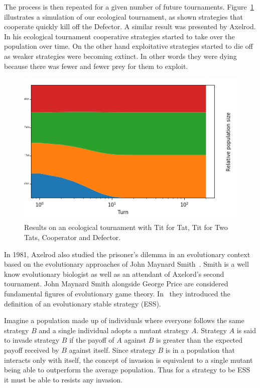 \documentclass{article}
\theoremstyle{definition}
\begin{document}
The process is then repeated for a given number of future tournaments.
Figure~\ref{fig:ecological_tournament} illustrates a simulation of our
ecological tournament, as shown strategies that cooperate quickly kill off the Defector.
A similar result was presented by Axelrod. In his ecological tournament cooperative
strategies started to take over the population over time. On the other hand exploitative
strategies started to die off as weaker strategies were becoming extinct. In other
words they were dying because there was fewer and fewer prey for them to exploit.


\begin{figure}[!hbtp]
    \centering
    \includegraphics[width=.6\textwidth]{./assets/images/ecological_tournament.png}
    \caption{Results on an ecological tournament with Tit for Tat, Tit for Two Tats,
    Cooperator and Defector.}
    \label{fig:ecological_tournament}
\end{figure}

In 1981, Axelrod also studied the prisoner's dilemma in an evolutionary context based
on the evolutionary approaches of John Maynard Smith~\cite{Smith1973,
Smith1974, Smith1979}. Smith is a well know evolutionary biologist as well
as an attendant of Axelord's second tournament. John Maynard Smith alongside George Price
are considered fundamental figures of evolutionary game theory. In~\cite{Smith1973}
they introduced the definition of an evolutionary stable strategy (ESS).

Imagine a population made up of individuals where everyone follows the
same strategy \(B\) and a single individual adopts a mutant strategy \(A\).
Strategy \(A\) is said to invade strategy \(B\) if the payoff of \(A\) against \(B\)
is greater than the expected payoff received by \(B\) against itself.
Since strategy \(B\) is in a population that interacts only with itself,
the concept of invasion is equivalent to a single mutant being able to outperform
the average population. Thus for a strategy to be ESS it must be able to resists
any invasion.
\end{document}
